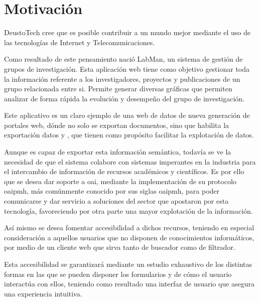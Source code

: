 \section{Motivación}

DeustoTech cree que es posible contribuir a un mundo mejor mediante el uso de las tecnologías de Internet y Telecomunicaciones.

Como resultado de este pensamiento nació LabMan, un sistema de gestión de grupos de investigación. Esta aplicación web tiene como objetivo gestionar toda la información referente a los investigadores, proyectos y publicaciones de un grupo relacionada entre si. Permite generar diversas gráficas que permiten analizar de forma rápida la evolución y desempeño del grupo de investigación.

Este aplicativo es un claro ejemplo de una web de datos de nueva generación de portales web, dónde no solo se exportan documentos, sino que habilita la exportación datos y , que tienen como propósito facilitar la explotación de datos.

Aunque es capaz de exportar esta información semántica, todavía se ve la necesidad de que el sistema colabore con sistemas imperantes en la industria para el intercambio de información de recursos académicos y científicos.
Es por ello que se desea dar soporte a \acrshort{oai}, mediante la implementación de su protocolo \acrlong{oaipmh}, más comúnmente conocido por sus siglas \acrshort{oaipmh}, para poder comunicarse y dar servicio a soluciones del sector que apostaron por esta tecnología, favoreciendo por otra parte una mayor explotación de la información.

Así mismo se desea fomentar accesibilidad a dichos recursos, teniendo en especial consideración a aquellos usuarios que no disponen de conocimientos informáticos, por medio de un cliente web que sirva tanto de buscador como de filtrador.

Esta accesibilidad se garantizará mediante un estudio exhaustivo de los distintas formas en las que se pueden disponer los formularios y de cómo el usuario interactúa con ellos, teniendo como resultado una interfaz de usuario que asegura una experiencia intuitiva.
